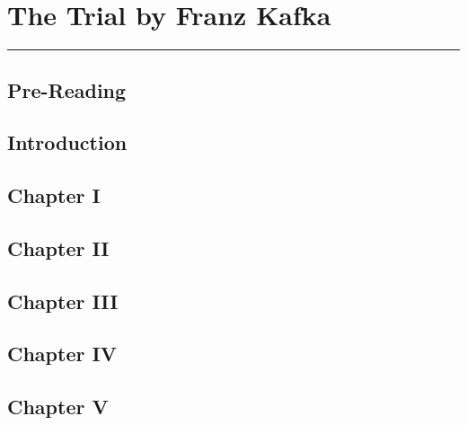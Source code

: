 \documentclass[a4paper, 12pt, twoside]{article}
\begin{document}
\section*{\LARGE The Trial \normalsize by Franz Kafka}
\vspace{-1cm}\rule{\textwidth}{0.8pt}

\subsection*{Pre-Reading}



\newpage

\subsection*{Introduction}



\newpage

\subsection*{Chapter I}



\newpage

\subsection*{Chapter II}



\newpage

\subsection*{Chapter III}



\newpage

\subsection*{Chapter IV}



\newpage

\subsection*{Chapter V}
\end{document}
